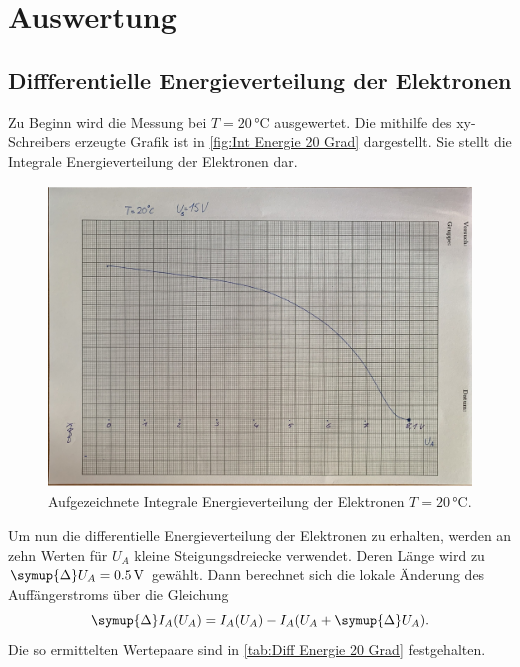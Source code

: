 \section{Auswertung}
\label{sec:Auswertung}

\subsection{Diffferentielle Energieverteilung der Elektronen}

Zu Beginn wird die Messung bei $T=20\,\unit{\celsius}$ ausgewertet.
Die mithilfe des xy-Schreibers erzeugte Grafik ist in \autoref{fig:Int Energie 20 Grad} dargestellt.
Sie stellt die Integrale Energieverteilung der Elektronen dar.

\begin{figure}[H]
  \centering
  \includegraphics[height=8cm]{content/pics/originaldaten/1.pdf}
  \caption{Aufgezeichnete Integrale Energieverteilung der Elektronen $T=20\,\unit{\celsius}$.}
  \label{fig:Int Energie 20 Grad}
\end{figure}

Um nun die differentielle Energieverteilung der Elektronen zu erhalten, werden an zehn Werten
für $U_A$ kleine Steigungsdreiecke verwendet.
Deren Länge wird zu $\symup{\Delta}U_A=0.5\,\unit{\volt}$ gewählt. Dann berechnet sich die lokale
Änderung des Auffängerstroms über die Gleichung
\begin{equation*}
\symup{\Delta}I_A(U_A)=I_A(U_A)-I_A(U_A+\symup{\Delta}U_A).
\end{equation*}
Die so ermittelten Wertepaare sind in \autoref{tab:Diff Energie 20 Grad} festgehalten.

